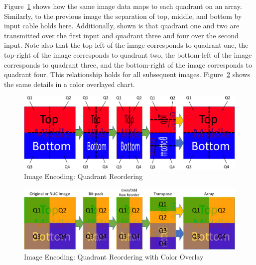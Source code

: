     Figure~\ref{fig:image_encoding_quads} shows how the same image data maps to each quadrant on an array. Similarly, to the previous image the separation of top, middle, and bottom by input cable holds here. Additionally, shown is that quadrant one and two are transmitted over the first input and quadrant three and four over the second input. Note also that the top-left of the image corresponds to quadrant one, the top-right of the image corresponds to quadrant two, the bottom-left of the image corresponds to quadrant three, and the bottom-right of the image corresponds to quadrant four. This relationship holds for all subsequent images. Figure~\ref{fig:image_encoding_colored} shows the same details in a color overlayed chart.

    \begin{figure}
        \centering
        \includegraphics[width=1.0\textwidth]{fig/image_encoding_quads.pdf}
        \caption{Image Encoding: Quadrant Reordering}
        \label{fig:image_encoding_quads}
    \end{figure}

    \begin{figure}
        \centering
        \includegraphics[width=1.0\textwidth]{fig/image_encoding_colored.pdf}
        \caption{Image Encoding: Quadrant Reordering with Color Overlay}
        \label{fig:image_encoding_colored}
    \end{figure}

